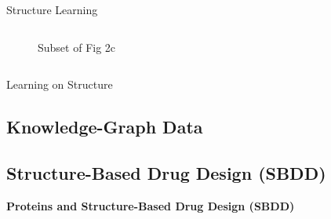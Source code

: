 \documentclass{beamer}
\begin{document}
\begin{frame}{Structure Learning}
\begin{columns}[T]
\begin{column}{0.5\textwidth}
\begin{figure}
            \caption{Subset of Fig 2c \cite{ektefaie_multimodal_2023}}
        \end{figure}    
    \end{column}
\end{columns}
\end{frame}

\begin{frame}{Learning on Structure}
    
\end{frame}


\subsection{Knowledge-Graph Data}


\subsection{Structure-Based Drug Design (SBDD)}

\begin{frame}{}
    \bf{\Large Proteins and Structure-Based Drug Design (SBDD)}    
\end{frame}

\end{document}

